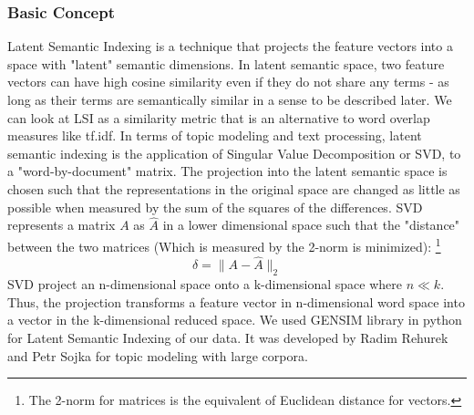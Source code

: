 \subsubsection{Basic Concept}
			Latent Semantic Indexing is a technique that projects the feature vectors into a space with "latent" semantic dimensions. In latent semantic space,  two feature vectors can have high cosine similarity even if they do not share any terms - as long as their terms are semantically similar in a sense to be described later. We can look at LSI as a
similarity metric that is an alternative to word overlap measures like tf.idf. 
		In terms of topic modeling and text processing, latent semantic indexing is the application of Singular Value Decomposition or SVD, to a "word-by-document" matrix. The projection into the latent semantic space is chosen such that the representations in the original space are changed as little as possible when measured by the sum of the squares of the
differences. 
		SVD represents a matrix $A$ as $\hat{A}$ in a lower dimensional space such that the "distance" between the two matrices (Which is measured by the 2-norm is minimized): \footnote{ The 2-norm for matrices is the equivalent of Euclidean distance for vectors.}
		$$ \delta = \| A - \hat{A} \| _{2}$$
		SVD project an n-dimensional space onto a k-dimensional space where $n \ll k$. Thus, the projection transforms a feature vector in n-dimensional word space into a vector in the k-dimensional reduced space. 
		We used GENSIM library \cite{gensim} in python for Latent Semantic Indexing of our data. It was developed by Radim Rehurek and Petr Sojka \cite{radimrehurek} for topic modeling with large corpora.
		 

